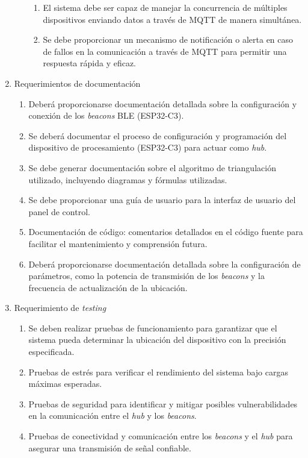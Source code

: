 \documentclass[
11pt, %
]{charter}
\begin{document}
\begin{enumerate}
\begin{enumerate}
\begin{enumerate}
					\item El sistema debe ser capaz de manejar la concurrencia de múltiples dispositivos enviando datos a través de MQTT de manera simultánea.
					\item Se debe proporcionar un mecanismo de notificación o alerta en caso de fallos en la comunicación a través de MQTT para permitir una respuesta rápida y eficaz.
				\end{enumerate}
		\end{enumerate}
	\item Requerimientos de documentación
		\begin{enumerate}
			\item Deberá proporcionarse documentación detallada sobre la configuración y conexión de los \textit{beacons} BLE (ESP32-C3).
			\item Se deberá documentar el proceso de configuración y programación del dispositivo de procesamiento (ESP32-C3) para actuar como \textit{hub}.
			\item Se debe generar documentación sobre el algoritmo de triangulación utilizado, incluyendo diagramas y fórmulas utilizadas.
			\item Se debe proporcionar una guía de usuario para la interfaz de usuario del panel de control.
			\item Documentación de código: comentarios detallados en el código fuente para facilitar el mantenimiento y comprensión futura.
			\item Deberá proporcionarse documentación detallada sobre la configuración de parámetros, como la potencia de transmisión de los \textit{beacons} y la frecuencia de actualización de la ubicación.
		\end{enumerate}
	\item Requerimiento de \textit{testing}
		\begin{enumerate}
			\item Se deben realizar pruebas de funcionamiento para garantizar que el sistema pueda determinar la ubicación del dispositivo con la precisión especificada.
			\item Pruebas de estrés para verificar el rendimiento del sistema bajo cargas máximas esperadas.
			\item Pruebas de seguridad para identificar y mitigar posibles vulnerabilidades en la comunicación entre el \textit{hub} y los \textit{beacons}.
			\item Pruebas de conectividad y comunicación entre los \textit{beacons} y el \textit{hub} para asegurar una transmisión de señal confiable.

\end{enumerate}
\end{enumerate}
\end{document}
